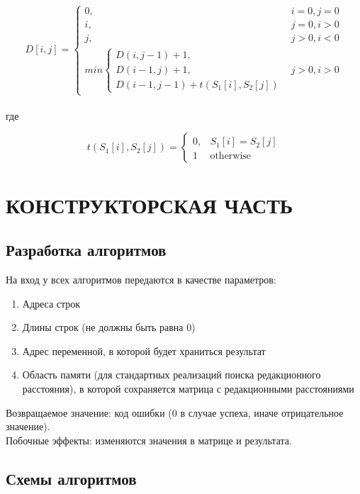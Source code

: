 \documentclass[a4paper,12pt]{article}
\begin{document}
\begin{displaymath}
D[i,j] = \left\{
\begin{array}{ll}
0, & i = 0, j = 0 \\
i, & j = 0, i > 0 \\
j, & j > 0, i < 0 \\
min\left\{
\begin{array}{ll}
D(i,j - 1) + 1, \\
D(i - 1,j) + 1, \\
D(i - 1,j - 1) + t(S_1[i],S_2[j])
\end{array}
\right.
& j > 0, i > 0
\end{array}
\right.
\end{displaymath}
\\
где

\begin{displaymath}
t(S_1[i],S_2[j]) = \left\{
\begin{array}{ll}
0, & S_1[i] = S_2[j] \\
1 & \text{otherwise}
\end{array}
\right.
\end{displaymath}


\newpage
\section{КОНСТРУКТОРСКАЯ ЧАСТЬ}

\subsection{Разработка алгоритмов}

На вход у всех алгоритмов передаются в качестве параметров:
\begin{enumerate}
\item Адреса строк
\item Длины строк (не должны быть равна 0)
\item Адрес переменной, в которой будет храниться результат
\item Область памяти (для стандартных реализаций поиска редакционного расстояния), в которой сохраняется матрица с редакционными расстояниями
\end{enumerate}
Возвращаемое значение: код ошибки (0 в случае успеха, иначе отрицательное значение). \\
Побочные эффекты: изменяются значения в матрице и результата.

\newpage
\subsection{Схемы алгоритмов}
\end{document}
